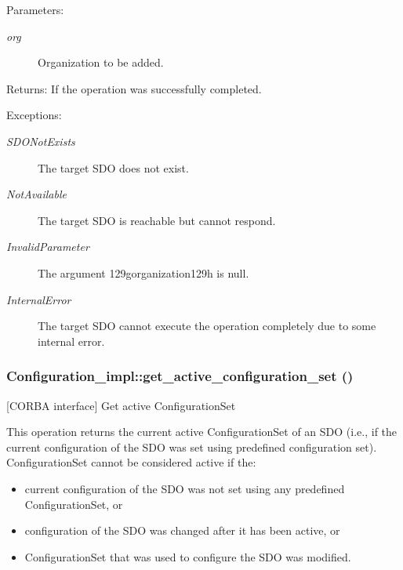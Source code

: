 \begin{Desc}
\item[Parameters:]
\begin{description}
\item[{\em org}]Organization to be added. \end{description}
\end{Desc}
\begin{Desc}
\item[Returns:]If the operation was successfully completed. \end{Desc}
\begin{Desc}
\item[Exceptions:]
\begin{description}
\item[{\em SDONot\-Exists}]The target SDO does not exist. \item[{\em Not\-Available}]The target SDO is reachable but cannot respond. \item[{\em Invalid\-Parameter}]The argument 129gorganization129h is null. \item[{\em Internal\-Error}]The target SDO cannot execute the operation completely due to some internal error.\end{description}
\end{Desc}
\subsubsection{\setlength{\rightskip}{0pt plus 5cm}Configuration\_\-impl::get\_\-active\_\-configuration\_\-set ()}\label{classConfiguration__impl_Configuration__impla13}


[CORBA interface] Get active Configuration\-Set 

This operation returns the current active Configuration\-Set of an SDO (i.e., if the current configuration of the SDO was set using predefined configuration set). Configuration\-Set cannot be considered active if the:

\begin{itemize}
\item current configuration of the SDO was not set using any predefined Configuration\-Set, or\item configuration of the SDO was changed after it has been active, or\item Configuration\-Set that was used to configure the SDO was modified.\end{itemize}


